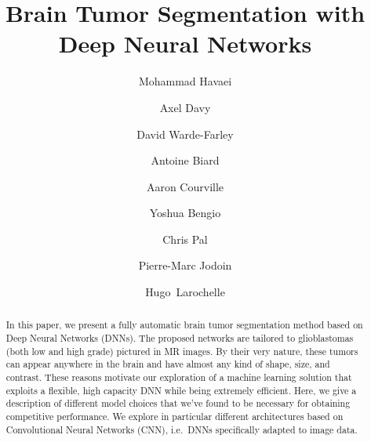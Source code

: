 \documentclass[final,5p,times,twocolumn]{elsarticle}
\begin{document}
\begin{frontmatter}



\title{Brain Tumor Segmentation with Deep Neural Networks}







\author[uds]{Mohammad Havaei}

\author[ens]{Axel Davy} 

\author[udm]{David Warde-Farley} 

\author[udm,polyp]{Antoine Biard}   

\author[udm]{Aaron Courville}

\author[udm]{Yoshua Bengio}

\author[udm,poly]{Chris Pal}

\author[uds]{Pierre-Marc Jodoin}

\author[uds,twitter]{Hugo~Larochelle}


\address[uds]{Universit\'e de Sherbrooke, Sherbrooke, Qc, Canada}

\address[ens]{\'Ecole Normale sup\'erieure, Paris, France}

\address[udm]{Universit\'e de Montr\'eal, Montr\'eal, Canada}

\address[polyp]{\'Ecole polytechnique, Palaiseau, France}

\address[poly]{\'Ecole Polytechnique de Montr\'eal , Canada}
\address[twitter]{Twitter, USA}




\begin{abstract}

  In this paper, we present a fully automatic brain tumor segmentation method based on Deep Neural Networks (DNNs).  The proposed networks are tailored to glioblastomas (both low and high grade) pictured in MR images.  By their very nature, these tumors can appear anywhere in the brain and have almost any kind of shape, size, and contrast. These reasons motivate our exploration of a machine learning solution that exploits a flexible, high capacity DNN while being extremely efficient. Here, we give a description of different model choices that we've found to be necessary for obtaining competitive performance. We explore in particular different architectures based on Convolutional Neural Networks (CNN), i.e.\ DNNs specifically adapted to image data. 
  

\end{abstract}
\end{frontmatter}
\end{document}
